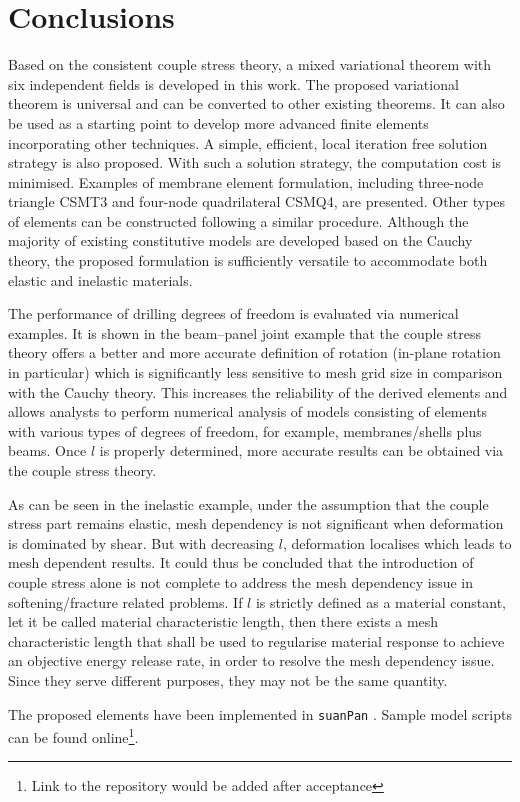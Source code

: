 \documentclass[3p,sort&compress,11pt,fleqn,review]{elsarticle}
\newcommand*{\alert}[1]{#1}
\begin{document}
\section{Conclusions}
Based on the consistent couple stress theory, a mixed variational theorem with six independent fields is developed in this work. \alert{The proposed variational theorem is universal and can be converted to other existing theorems. It can also be used as a starting point to develop more advanced finite elements incorporating other techniques.} A simple, efficient, local iteration free solution strategy is also proposed. \alert{With such a solution strategy, the computation cost is minimised.} Examples of membrane element formulation, including three-node triangle CSMT3 and four-node quadrilateral CSMQ4, are presented. Other types of elements can be constructed following a similar procedure. Although the majority of existing constitutive models are developed based on the Cauchy theory, the proposed formulation is sufficiently versatile to accommodate both elastic and inelastic materials.

The performance of drilling degrees of freedom is evaluated via numerical examples. It is shown in the beam--panel joint example that the couple stress theory offers a better \alert{and more accurate} definition of rotation (in-plane rotation in particular) which is significantly less sensitive to mesh grid size \alert{in comparison with the Cauchy theory}. This \alert{increases the reliability of the derived elements and} allows analysts to perform numerical analysis of models consisting of elements with various types of degrees of freedom\alert{, for example, membranes/shells plus beams}. Once $l$ is properly determined, more accurate results can be obtained via the couple stress theory.

\alert{As can be seen in the inelastic example, under the assumption that the couple stress part remains elastic, mesh dependency is not significant when deformation is dominated by shear. But with decreasing $l$, deformation localises which leads to mesh dependent results.} It could thus be concluded that the introduction of couple stress alone is not complete to address the mesh dependency issue in softening/fracture related problems. If $l$ is strictly defined as a material constant, let it be called material characteristic length, then there exists a mesh characteristic length that shall be used to regularise material response to achieve an objective energy release rate\alert{, in order to resolve the mesh dependency issue}. Since they serve different purposes, they may not be the same quantity.

The proposed elements have been implemented in \texttt{suanPan} \citep{Chang2021}. Sample model scripts can be found online\footnote{Link to the repository would be added after acceptance}.


\end{document}
